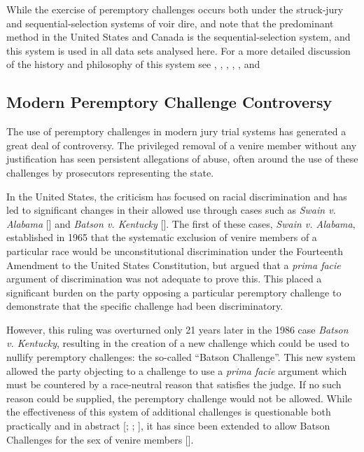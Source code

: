 While the exercise of peremptory challenges occurs both under the struck-jury and sequential-selection systems of voir dire, \cite{ford2010} and \cite{vandykejurysel} note that the predominant method in the United States and Canada is the sequential-selection system, and this system is used in all data sets analysed here. For a more detailed discussion of the history and philosophy of this system see \cite{vonmosch1921}, \cite{hoffman1997},  \cite{woolley2018}, \cite{rvsherratt}, \cite{hansvidjudging}, and \cite{vandykejurysel}

\subsection{Modern Peremptory Challenge Controversy} \label{sec:modper}

The use of peremptory challenges in modern jury trial systems has generated a great deal of controversy. The privileged
removal of a venire member without any justification
has seen persistent allegations of abuse, often around the use of these challenges by prosecutors representing the state.

In the United States, the criticism has focused on racial discrimination and has led to significant changes in their allowed use
through cases such as \textit{Swain v. Alabama} [\cite{swainvalabama}] and \textit{Batson v. Kentucky}
[\cite{batsonvkentucky}]. The first of these cases, \textit{Swain v. Alabama}, established in 1965 that the systematic exclusion
of venire members of a particular race would be unconstitutional discrimination under the Fourteenth Amendment to the United
States Constitution, but argued that a \textit{prima facie} argument of discrimination was not adequate to prove this. This placed a significant burden on the party opposing a
particular peremptory challenge to demonstrate that the specific challenge had been discriminatory.

However, this ruling was overturned only 21 years later in the 1986 case \textit{Batson v. Kentucky}, resulting in the creation of a new challenge which
could be used to nullify peremptory challenges: the so-called ``Batson Challenge''. This new system allowed the
party objecting to a challenge to use a \textit{prima facie} argument which must be countered by a race-neutral reason that
satisfies the judge. If no such reason could be supplied, the peremptory challenge would not be allowed. While the
effectiveness of this system of additional challenges is questionable both practically and in abstract [\cite{page2005};
\cite{morehead1994}; \cite{hoffman1997}], it has since been extended to allow Batson
Challenges for the sex of venire members [\cite{jebvalabama}].

